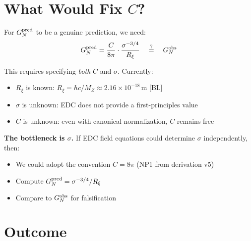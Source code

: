 \documentclass[11pt,a4paper]{article}
\newcommand{\BL}{\textsc{[BL]}}
\begin{document}
\section{What Would Fix $C$?}

For $G_N^{\rm pred}$ to be a genuine prediction, we need:
\begin{equation}
G_N^{\rm pred} = \frac{C}{8\pi} \cdot \frac{\sigma^{-3/4}}{R_\xi}
\quad \stackrel{?}{=} \quad G_N^{\rm obs}
\end{equation}

This requires specifying \textit{both} $C$ and $\sigma$. Currently:
\begin{itemize}
\item $R_\xi$ is known: $R_\xi = \hbar c / M_Z \approx 2.16 \times 10^{-18}$\,m \BL
\item $\sigma$ is unknown: EDC does not provide a first-principles value
\item $C$ is unknown: even with canonical normalization, $C$ remains free
\end{itemize}

\textbf{The bottleneck is $\sigma$.} If EDC field equations could determine
$\sigma$ independently, then:
\begin{itemize}
\item We could adopt the convention $C = 8\pi$ (NP1 from derivation v5)
\item Compute $G_N^{\rm pred} = \sigma^{-3/4} / R_\xi$
\item Compare to $G_N^{\rm obs}$ for falsification
\end{itemize}

\section{Outcome}
\end{document}
